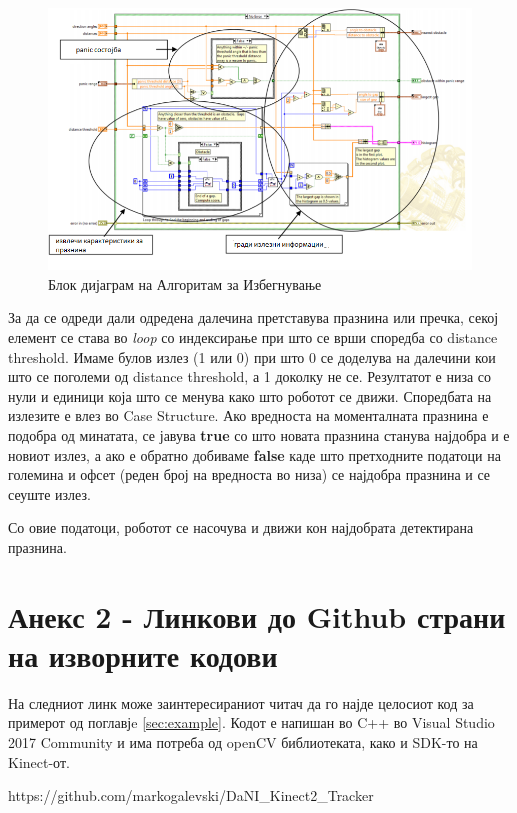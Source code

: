 \documentclass[12pt]{article}
\begin{document}
  \begin{figure}[H]
    \includegraphics[width=0.75\linewidth]{vfh_block_diagram.png}
    \centering
    \caption{Блок дијаграм на Алгоритам за Избегнување}
    \label{fig:vfh_block_diagram.png}
    \end{figure}

  За да се одреди дали одредена далечина претставува празнина или пречка, секој елемент се става во \textit{loop} со индексирање при што се врши споредба со distance threshold. Имаме булов излез (1 или 0) при што 0 се доделува на далечини кои што се поголеми од distance threshold, а 1 доколку не се. Резултатот е низа со нули и единици која што се менува како што роботот се движи. Споредбата на излезите е влез во Case Structure. Ако вредноста на моменталната празнина е подобра од минатата, се јавува \textbf{true} со што новата празнина станува најдобра и е новиот излез, а ако е обратно добиваме \textbf{false} каде што претходните податоци на големина и офсет (реден број на вредноста во низа) се најдобра празнина и се сеуште излез.

  Со овие податоци, роботот се насочува и движи кон најдобрата детектирана празнина.
\newpage
\section{Анекс 2 - Линкови до Github страни на изворните кодови}
    На следниот линк може заинтересираниот читач да го најде целосиот код за примерот од поглавјe \ref{sec:example}. Кодот е напишан во C++ во Visual Studio 2017 Community и има потреба од openCV библиотеката, како и SDK-то на Kinect-от.

    https://github.com/markogalevski/DaNI\_Kinect2\_Tracker
\end{document}
